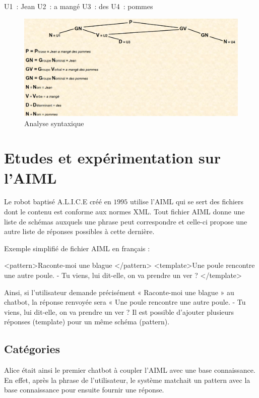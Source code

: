 U1 : Jean
U2 : a mangé
U3 : des
U4 : pommes

\begin{figure}[H]
	\centering
		\includegraphics[width = \textwidth]{analyseSyntaxique.png}
	\caption{Analyse syntaxique}
	\label{fig:Analyse syntaxique}
\end{figure}

\section{Etudes et expérimentation sur l'AIML}

Le robot baptisé A.L.I.C.E créé en $1995$ utilise l’AIML qui se sert des fichiers dont le contenu est conforme aux normes XML. Tout fichier AIML donne une liste de schémas auxquels une phrase peut correspondre et celle-ci propose une autre liste de réponses possibles à cette dernière.
\vspace{1em}

Exemple simplifié de fichier AIML en français \cite{ref11}:
\vspace{1em}

<pattern>Raconte-moi une blague </pattern>
<template>Une poule rencontre une autre poule. - Tu viens, lui dit-elle, on va prendre un ver ? </template>
\vspace{1em}

Ainsi, si l’utilisateur demande précisément « Raconte-moi une blague » au chatbot, la réponse renvoyée sera « Une poule rencontre une autre poule. - Tu viens, lui dit-elle, on va prendre un ver ? Il est possible d’ajouter plusieurs réponses (template) pour un même schéma (pattern). 

\subsection{Catégories}

Alice était ainsi le premier chatbot à coupler l’AIML avec une base connaissance. En effet, après la phrase de l’utilisateur, le système matchait un pattern avec la base connaissance pour ensuite fournir une réponse. \cite{ref12}
\vspace{1em}

